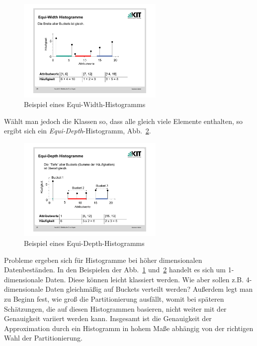 \begin{figure}[ht]
	\centering
	\includegraphics[width=0.625\textwidth]{Figures/equiWidth}
	\caption[Equi-Width Beispiel]{Beispiel eines Equi-Width-Histogramms \footnotemark}
	\label{fig:equiWidth}
\end{figure}

\noindent Wählt man jedoch die Klassen so, dass alle gleich viele Elemente enthalten, so ergibt sich ein \textit{Equi-Depth}-Histogramm, Abb.~\ref{fig:equiDepth}.

\begin{figure}[ht]
	\centering
	\includegraphics[width=0.625\textwidth]{Figures/equiDepth}
	\caption[Equi-Width Beispiel]{Beispiel eines Equi-Depth-Histogramms \footnotemark}
	\label{fig:equiDepth}
\end{figure}

Probleme ergeben sich für Histogramme bei höher dimensionalen Datenbeständen. In den Beispielen der Abb.~\ref{fig:equiWidth} und~\ref{fig:equiDepth} handelt es sich um 1-dimensionale Daten. Diese können leicht klassiert werden. Wie aber sollen z.B. 4-dimensionale Daten gleichmäßig auf Buckets verteilt werden? Außerdem legt man zu Beginn fest, wie groß die Partitionierung ausfällt, womit bei späteren Schätzungen, die auf diesen Histogrammen basieren, nicht weiter mit der Genauigkeit variiert werden kann. Insgesamt ist die Genauigkeit der Approximation durch ein Histogramm in hohem Maße abhängig von der richtigen Wahl der Partitionierung.


